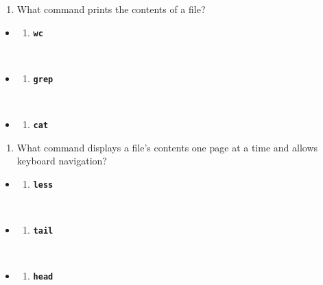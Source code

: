 \documentclass[
  letterpaper,
  DIV=11,
  numbers=noendperiod]{scrreprt}
\providecommand{\tightlist}{%
  \setlength{\itemsep}{0pt}\setlength{\parskip}{0pt}}
\begin{document}
\begin{enumerate}
\def\labelenumi{\arabic{enumi}.}
\setcounter{enumi}{2}
\tightlist
\item
  What command prints the contents of a file?
\end{enumerate}

\begin{itemize}
\tightlist
\item
  \begin{enumerate}
  \def\labelenumi{(\Alph{enumi})}
  \tightlist
  \item
    \textbf{\texttt{wc}}\strut \\
  \end{enumerate}
\item
  \begin{enumerate}
  \def\labelenumi{(\Alph{enumi})}
  \setcounter{enumi}{1}
  \tightlist
  \item
    \textbf{\texttt{grep}}\strut \\
  \end{enumerate}
\item
  \begin{enumerate}
  \def\labelenumi{(\Alph{enumi})}
  \setcounter{enumi}{2}
  \tightlist
  \item
    \textbf{\texttt{cat}}
  \end{enumerate}
\end{itemize}

\begin{enumerate}
\def\labelenumi{\arabic{enumi}.}
\setcounter{enumi}{3}
\tightlist
\item
  What command displays a file's contents one page at a time and allows
  keyboard navigation?
\end{enumerate}

\begin{itemize}
\tightlist
\item
  \begin{enumerate}
  \def\labelenumi{(\Alph{enumi})}
  \tightlist
  \item
    \textbf{\texttt{less}}\strut \\
  \end{enumerate}
\item
  \begin{enumerate}
  \def\labelenumi{(\Alph{enumi})}
  \setcounter{enumi}{1}
  \tightlist
  \item
    \textbf{\texttt{tail}}\strut \\
  \end{enumerate}
\item
  \begin{enumerate}
  \def\labelenumi{(\Alph{enumi})}
  \setcounter{enumi}{2}
  \tightlist
  \item
    \textbf{\texttt{head}}
  \end{enumerate}
\end{itemize}
\end{document}
